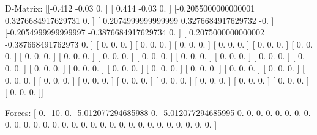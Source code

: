 D-Matrix:
[[-0.412              -0.03                0.                ]
 [ 0.414              -0.03                0.                ]
 [-0.2055000000000001  0.3276684917629731  0.                ]
 [ 0.2074999999999999  0.3276684917629732 -0.                ]
 [-0.2054999999999997 -0.3876684917629734  0.                ]
 [ 0.2075000000000002 -0.387668491762973   0.                ]
 [ 0.                  0.                  0.                ]
 [ 0.                  0.                  0.                ]
 [ 0.                  0.                  0.                ]
 [ 0.                  0.                  0.                ]
 [ 0.                  0.                  0.                ]
 [ 0.                  0.                  0.                ]
 [ 0.                  0.                  0.                ]
 [ 0.                  0.                  0.                ]
 [ 0.                  0.                  0.                ]
 [ 0.                  0.                  0.                ]
 [ 0.                  0.                  0.                ]
 [ 0.                  0.                  0.                ]
 [ 0.                  0.                  0.                ]
 [ 0.                  0.                  0.                ]
 [ 0.                  0.                  0.                ]
 [ 0.                  0.                  0.                ]
 [ 0.                  0.                  0.                ]
 [ 0.                  0.                  0.                ]
 [ 0.                  0.                  0.                ]
 [ 0.                  0.                  0.                ]
 [ 0.                  0.                  0.                ]
 [ 0.                  0.                  0.                ]
 [ 0.                  0.                  0.                ]
 [ 0.                  0.                  0.                ]
 [ 0.                  0.                  0.                ]
 [ 0.                  0.                  0.                ]
 [ 0.                  0.                  0.                ]
 [ 0.                  0.                  0.                ]
 [ 0.                  0.                  0.                ]
 [ 0.                  0.                  0.                ]]

Forces:
[  0.                -10.                  0.
  -5.012077294685988   0.                 -5.012077294685995
   0.                  0.                  0.
   0.                  0.                  0.
   0.                  0.                  0.
   0.                  0.                  0.
   0.                  0.                  0.
   0.                  0.                  0.
   0.                  0.                  0.
   0.                  0.                  0.
   0.                  0.                  0.
   0.                  0.                  0.               ]

